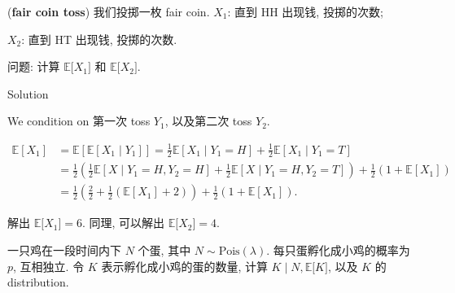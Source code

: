 \documentclass{qlnotes-export}
\begin{document}
\begin{example}

(\textbf{fair coin toss}) 我们投掷一枚 fair coin. \(X_{1}\): 直到 HH 出现钱, 投掷的次数;

\(X_{2}\): 直到 HT 出现钱, 投掷的次数.

问题: 计算 \({\mathbb{E}}\lbrack X_{1}\rbrack\) 和 \({\mathbb{E}}\lbrack X_{2}\rbrack\).

\end{example}

\begin{qlsolution}{Solution}

We condition on 第一次 toss \(Y_{1}\), 以及第二次 toss \(Y_{2}\).

\[\begin{matrix}
{{\mathbb{E}}\left\lbrack X_{1} \right\rbrack} & {= {\mathbb{E}}\left\lbrack {{\mathbb{E}}\left\lbrack {X_{1} \mid Y_{1}} \right\rbrack} \right\rbrack = \frac{1}{2}{\mathbb{E}}\left\lbrack {X_{1} \mid Y_{1} = H} \right\rbrack + \frac{1}{2}{\mathbb{E}}\left\lbrack {X_{1} \mid Y_{1} = T} \right\rbrack} \\
 & {= \frac{1}{2}\left( {\frac{1}{2}{\mathbb{E}}\left\lbrack {X \mid Y_{1} = H,Y_{2} = H} \right\rbrack + \frac{1}{2}{\mathbb{E}}\left\lbrack {X \mid Y_{1} = H,Y_{2} = T} \right\rbrack} \right) + \frac{1}{2}\left( {1 + {\mathbb{E}}\left\lbrack X_{1} \right\rbrack} \right)} \\
 & {= \frac{1}{2}\left( {\frac{2}{2} + \frac{1}{2}\left( {{\mathbb{E}}\left\lbrack X_{1} \right\rbrack + 2} \right)} \right) + \frac{1}{2}\left( {1 + {\mathbb{E}}\left\lbrack X_{1} \right\rbrack} \right).}
\end{matrix}\]

解出 \({\mathbb{E}}\lbrack X_{1}\rbrack = 6\). 同理, 可以解出 \({\mathbb{E}}\lbrack X_{2}\rbrack = 4\).

\end{qlsolution}

\begin{example}

一只鸡在一段时间内下 \(N\) 个蛋, 其中 \(N \sim \text{Pois}(\lambda)\). 每只蛋孵化成小鸡的概率为 \(p\), 互相独立. 令 \(K\) 表示孵化成小鸡的蛋的数量, 计算 \(\left. K \middle| N,{\mathbb{E}}\lbrack K\rbrack \right.\), 以及 \(K\) 的 distribution.

\end{example}
\end{document}
